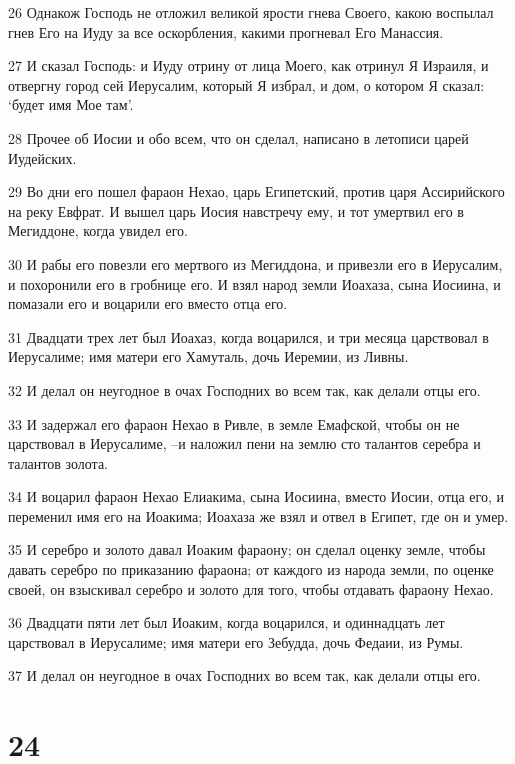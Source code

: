 \par 26 Однакож Господь не отложил великой ярости гнева Своего, какою воспылал гнев Его на Иуду за все оскорбления, какими прогневал Его Манассия.
\par 27 И сказал Господь: и Иуду отрину от лица Моего, как отринул Я Израиля, и отвергну город сей Иерусалим, который Я избрал, и дом, о котором Я сказал: `будет имя Мое там'.
\par 28 Прочее об Иосии и обо всем, что он сделал, написано в летописи царей Иудейских.
\par 29 Во дни его пошел фараон Нехао, царь Египетский, против царя Ассирийского на реку Евфрат. И вышел царь Иосия навстречу ему, и тот умертвил его в Мегиддоне, когда увидел его.
\par 30 И рабы его повезли его мертвого из Мегиддона, и привезли его в Иерусалим, и похоронили его в гробнице его. И взял народ земли Иоахаза, сына Иосиина, и помазали его и воцарили его вместо отца его.
\par 31 Двадцати трех лет был Иоахаз, когда воцарился, и три месяца царствовал в Иерусалиме; имя матери его Хамуталь, дочь Иеремии, из Ливны.
\par 32 И делал он неугодное в очах Господних во всем так, как делали отцы его.
\par 33 И задержал его фараон Нехао в Ривле, в земле Емафской, чтобы он не царствовал в Иерусалиме, --и наложил пени на землю сто талантов серебра и талантов золота.
\par 34 И воцарил фараон Нехао Елиакима, сына Иосиина, вместо Иосии, отца его, и переменил имя его на Иоакима; Иоахаза же взял и отвел в Египет, где он и умер.
\par 35 И серебро и золото давал Иоаким фараону; он сделал оценку земле, чтобы давать серебро по приказанию фараона; от каждого из народа земли, по оценке своей, он взыскивал серебро и золото для того, чтобы отдавать фараону Нехао.
\par 36 Двадцати пяти лет был Иоаким, когда воцарился, и одиннадцать лет царствовал в Иерусалиме; имя матери его Зебудда, дочь Федаии, из Румы.
\par 37 И делал он неугодное в очах Господних во всем так, как делали отцы его.

\chapter{24}


